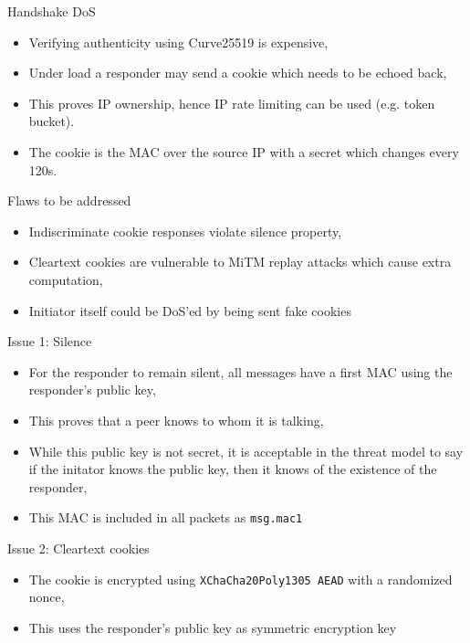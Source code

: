 \documentclass[xcolor=table]{beamer}
\begin{document}
    \begin{frame}{Handshake DoS}
    \begin{itemize}
        \item Verifying authenticity using Curve25519 is expensive,
        \item Under load a responder may send a cookie which needs to be echoed back,
        \item This proves IP ownership, hence IP rate limiting can be used (e.g. token bucket).
        \item The cookie is the MAC over the source IP with a secret which changes every 120s.
    \end{itemize}
    \end{frame}

    \begin{frame}{Flaws to be addressed}
        \begin{itemize}
            \item Indiscriminate cookie responses violate silence property,
            \item Cleartext cookies are vulnerable to MiTM replay attacks which cause extra computation,
            \item Initiator itself could be DoS'ed by being sent fake cookies
        \end{itemize}
    \end{frame}

    \begin{frame}{Issue 1: Silence}
        \begin{itemize}
            \item For the responder to remain silent, all messages have a first MAC using the responder's public key,
            \item This proves that a peer knows to whom it is talking,
            \item While this public key is not secret, it is acceptable in the threat model to say if the initator knows the public key, then it knows of the existence of the responder,
            \item This MAC is included in all packets as \texttt{msg.mac1}
        \end{itemize}
    \end{frame}

    \begin{frame}{Issue 2: Cleartext cookies}
    \begin{itemize}
        \item The cookie is encrypted using \texttt{XChaCha20Poly1305 AEAD} with a randomized nonce,
        \item This uses the responder's public key as symmetric encryption key
    \end{itemize}
    \end{frame}
\end{document}
